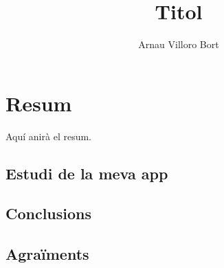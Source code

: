 \documentclass{book}
\title{Titol}
\author{Arnau Villoro Bort}
\begin{document}
\frontmatter

\maketitle

\chapter*{Resum} \label{sec:Resum}
Aquí anirà el resum.

\tableofcontents





\mainmatter





\section{Estudi de la meva app}

\section{Conclusions}
\section{Agraïments}


\end{document}
